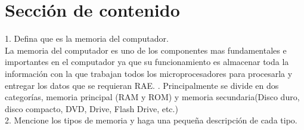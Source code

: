 \documentclass{article}
\begin{document}
\section{Sección de contenido} \label{contenido}

1.	Defina que es la memoria del computador.
\\

La memoria del computador es uno de los componentes mas fundamentales e importantes en el computador ya que su funcionamiento es almacenar toda la información con la que trabajan todos los microprocesadores para procesarla y entregar los datos que se requieran RAE. \cite{articuloprofe}. Principalmente se divide en dos categorías, memoria principal (RAM y ROM) y memoria secundaria(Disco duro, disco compacto, DVD, Drive, Flash Drive, etc.)
\\
  

2.	Mencione los tipos de memoria y haga una pequeña descripción de cada tipo.\\
\end{document}
